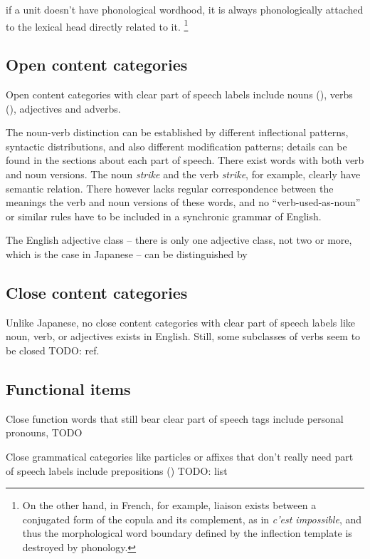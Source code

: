 \documentclass[UTF8, a4paper, oneside, scheme=plain, 12pt]{ctexbook}
\newcommand{\form}[1]{\emph{#1}}
\begin{document}
if a unit doesn't have phonological wordhood, 
it is always phonologically attached to the lexical head directly related to it.%
\footnote{
    On the other hand, in French, for example, 
    liaison exists between a conjugated form of the copula 
    and its complement, as in \form{c'est impossible}, 
    and thus the morphological word boundary defined by 
    the inflection template is destroyed by phonology. 
}


\subsection{Open content categories}

Open content categories with clear part of speech labels
include nouns (), 
verbs (), adjectives and adverbs.

The noun-verb distinction can be established by 
different inflectional patterns, syntactic distributions,
and also different modification patterns;
details can be found in the sections about each part of speech.
There exist words with both verb and noun versions.
The noun \form{strike} and the verb \form{strike}, for example,
clearly have semantic relation.
There however lacks regular correspondence between the meanings 
the verb and noun versions of these words, 
and no ``verb-used-as-noun'' or similar rules have to be included 
in a synchronic grammar of English.

The English adjective class -- there is only one adjective class, not two or more,
which is the case in Japanese -- 
can be distinguished by 

\subsection{Close content categories}

Unlike Japanese, no close content categories with clear part of speech labels 
like noun, verb, or adjectives exists in English.
Still, some subclasses of verbs seem to be closed TODO: ref.

\subsection{Functional items}

Close function words that still bear clear part of speech tags  
include personal pronouns, TODO

Close grammatical categories like particles or affixes that don't really need part of speech labels
include prepositions () TODO: list
\end{document}
